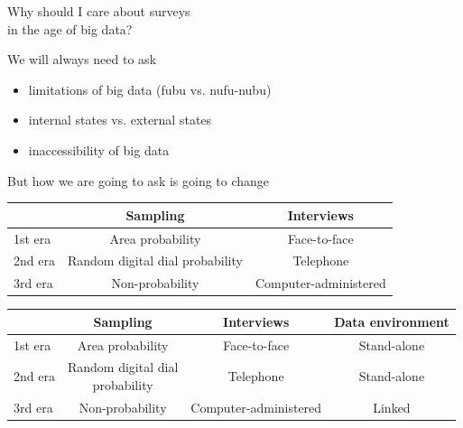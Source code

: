 \documentclass[aspectratio=169]{beamer}
\begin{document}
\begin{frame}

\begin{center}
\LARGE{Why should I care about surveys\\in the age of big data?}
\end{center}

\end{frame}
\begin{frame}

We will always need to ask
\begin{itemize}
\item limitations of big data (fubu vs. nufu-nubu)
\pause
\item internal states vs. external states
\pause
\item inaccessibility of big data
\end{itemize}

\pause
\vfill
But how we are going to ask is going to change
\end{frame}
\begin{frame}

\begin{center}
\begin{tabular}{ l c c}
           & Sampling& Interviews \\
\hline
1st era & Area probability & Face-to-face \\
\pause
2nd era & Random digital dial probability & Telephone \\
\pause
3rd era & \pause Non-probability & Computer-administered  \\
\end{tabular}
\end{center}

\end{frame}
\begin{frame}

\begin{center}
\small{
\begin{tabular}{ l c c c}
           & Sampling & Interviews & Data environment\\
\hline
1st era & Area probability & Face-to-face & Stand-alone \\
2nd era & \parbox[t]{3cm}{\centering Random digital dial\\probability} & Telephone & Stand-alone \\
3rd era & Non-probability & Computer-administered  & Linked \\
\end{tabular}
}
\end{center}

\end{frame}
\end{document}
